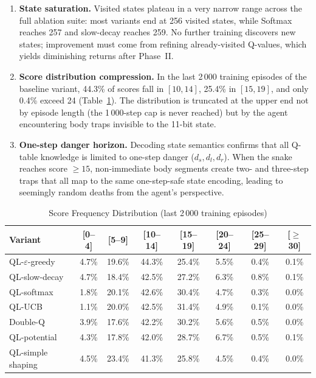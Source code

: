 \documentclass[10pt,conference]{IEEEtran}
\begin{document}
\begin{enumerate}
  \item \textbf{State saturation.}
        Visited states plateau in a very narrow range across the full
        ablation suite: most variants end at 256 visited states, while
        Softmax reaches 257 and slow-decay reaches 259.
        No further training discovers new states; improvement must come
        from refining already-visited Q-values,
        which yields diminishing returns after Phase~II.

  \item \textbf{Score distribution compression.}
        In the last 2\,000 training episodes of the baseline variant,
        44.3\% of scores fall in $[10,14]$, 25.4\% in $[15,19]$, and
        only 0.4\% exceed 24 (Table~\ref{tab:scoredist}).
        The distribution is truncated at the upper end not by episode
        length (the 1\,000-step cap is never reached) but by the agent
        encountering body traps invisible to the 11-bit state.

  \item \textbf{One-step danger horizon.}
        Decoding state semantics confirms that all Q-table knowledge
        is limited to one-step danger ($d_s,d_l,d_r$).
        When the snake reaches score $\geq15$, non-immediate body
        segments create two- and three-step traps that all map to the
        same one-step-safe state encoding,
        leading to seemingly random deaths from the agent's perspective.
\end{enumerate}

\begin{table}[!t]  %
  \centering
  \caption{Score Frequency Distribution (last 2\,000 training episodes)}
  \label{tab:scoredist}
  \begin{tabular}{lccccccc}
    \toprule
    Variant & [0--4] & [5--9] & [10--14] & [15--19] & [20--24] & [25--29] & [$\geq$30]\\
    \midrule
    QL-$\varepsilon$-greedy & 4.7\% & 19.6\% & 44.3\% & 25.4\% &  5.5\% & 0.4\% & 0.1\%\\
    QL-slow-decay     & 4.7\% & 18.4\% & 42.5\% & 27.2\% &  6.3\% & 0.8\% & 0.1\%\\
    QL-softmax        & 1.8\% & 20.1\% & 42.6\% & 30.4\% &  4.7\% & 0.3\% & 0.0\%\\
    QL-UCB            & 1.1\% & 20.0\% & 42.5\% & 31.4\% &  4.9\% & 0.1\% & 0.0\%\\
    Double-Q          & 3.9\% & 17.6\% & 42.2\% & 30.2\% &  5.6\% & 0.5\% & 0.0\%\\
    QL-potential      & 4.3\% & 17.8\% & 42.0\% & 28.7\% &  6.7\% & 0.5\% & 0.1\%\\
    QL-simple shaping & 4.5\% & 23.4\% & 41.3\% & 25.8\% &  4.5\% & 0.4\% & 0.0\%\\
    \bottomrule
  \end{tabular}
\end{table}
\FloatBarrier
\end{document}
